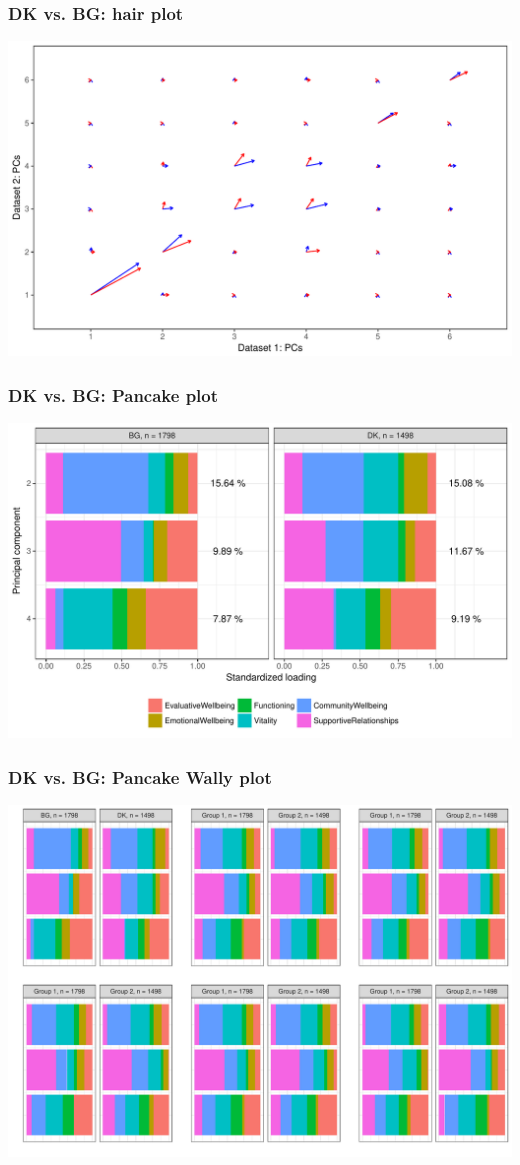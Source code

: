 \documentclass[a4]{beamer}
\begin{document}
\begin{frame}
\frametitle{DK vs. BG: hair plot}
\includegraphics[scale = 0.5]{essDKBGhair.pdf}
\end{frame}

\begin{frame}
\frametitle{DK vs. BG: Pancake plot}
\includegraphics[scale = 0.5]{essDKBGpancake234.pdf}
\end{frame}

\begin{frame}
\frametitle{DK vs. BG: Pancake Wally plot}
\includegraphics[scale = 0.4]{essDKBGWallyPCADSC234.pdf}
\end{frame}
\end{document}
